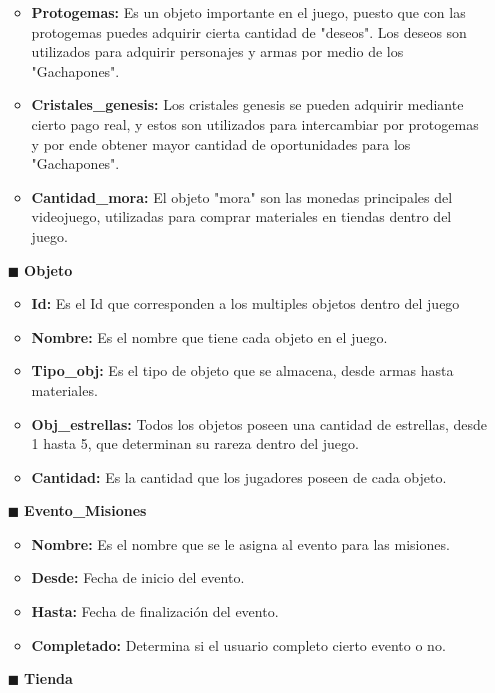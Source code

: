 \documentclass{report}
\begin{document}
\begin{itemize}
\begin{itemize}
            \item \textbf{Protogemas: } Es un objeto importante en el juego, puesto que con las protogemas puedes adquirir cierta cantidad de "deseos". Los deseos son utilizados para adquirir personajes y armas por medio de los "Gachapones".
            \item \textbf{Cristales\_genesis: } Los cristales genesis se pueden adquirir mediante cierto pago real, y estos son utilizados para intercambiar por protogemas y por ende obtener mayor cantidad de oportunidades para los "Gachapones".
            \item \textbf{Cantidad\_mora: } El objeto "mora" son las monedas principales del videojuego, utilizadas para comprar materiales en tiendas dentro del juego.
        \end{itemize}
    \item[$\blacksquare$] \textbf{Objeto}
        \begin{itemize}
            \item \textbf{Id: } Es el Id que corresponden a los multiples objetos dentro del juego
            \item \textbf{Nombre: } Es el nombre que tiene cada objeto en el juego.
            \item \textbf{Tipo\_obj: } Es el tipo de objeto que se almacena, desde armas hasta materiales.
            \item \textbf{Obj\_estrellas: } Todos los objetos poseen una cantidad de estrellas, desde 1 hasta 5, que determinan su rareza dentro del juego. 
            \item \textbf{Cantidad: } Es la cantidad que los jugadores poseen de cada objeto.
        \end{itemize}
    \item [$\blacksquare$]\textbf{Evento\_Misiones}
        \begin{itemize}
            \item \textbf{Nombre: } Es el nombre que se le asigna al evento para las misiones.
            \item \textbf{Desde: } Fecha de inicio del evento.
            \item \textbf{Hasta: } Fecha de finalización del evento.
            \item \textbf {Completado: } Determina si el usuario completo cierto evento o no.
        \end{itemize}
    \item[$\blacksquare$]\textbf{Tienda}
        \begin{itemize}

\end{itemize}
\end{itemize}
\end{document}
